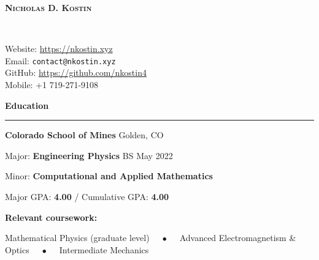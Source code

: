 \documentclass{article}
\numberwithin{equation}{section}
\begin{document}
\thispagestyle{empty}

\begin{minipage}{0.63\textwidth}
\begin{flushleft}
\textsc{\Huge{\textbf{Nicholas D. Kostin}}}
\end{flushleft}
\end{minipage}
~
\begin{minipage}{0.35\textwidth}
\begin{flushright}
\parbox[c]{\textwidth}{Website: \url{https://nkostin.xyz} \\ Email: \texttt{contact@nkostin.xyz} \\ GitHub: \url{https://github.com/nkostin4} \\ Mobile: +1 719-271-9108}
\end{flushright}
\end{minipage}

\vspace{1em}

\textbf{\Large{Education}} \\[-0.5em]
\rule{\textwidth}{1pt}

\hspace{1.5em} \textbf{Colorado School of Mines} \hfill Golden, CO

\hspace{1.5em} Major: \textbf{Engineering Physics} \hfill BS May 2022

\hspace{1.5em} Minor: \textbf{Computational and Applied Mathematics}

\vspace{1em}

\hspace{1.5em} Major GPA: \textbf{4.00} / Cumulative GPA: \textbf{4.00}

\vspace{1em}

\hspace{1.5em} \textbf{Relevant coursework:}

\hspace{3.0em} Mathematical Physics (graduate level) $\quad\bullet\quad$ Advanced Electromagnetism \& Optics $\quad\bullet\quad$ Intermediate Mechanics
\end{document}
